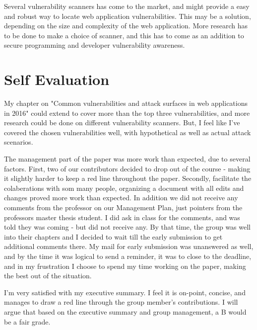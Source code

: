 Several vulnerability scanners has come to the market, and might provide a easy and robust way to locate web application vulnerabilities. This may be a solution, depending on the size and complexity of the web application. More research has to be done to make a choice of scanner, and this has to come as an addition to secure programming and developer vulnerability awareness.

\section*{Self Evaluation}
My chapter on "Common vulnerabilities and attack surfaces in web applications in 2016" could extend to cover more than the top three vulnerabilities, and more research could be done on different vulnerability scanners. But, I feel like I've covered the chosen vulnerabilities well, with hypothetical as well as actual attack scenarios.

The management part of the paper was more work than expected, due to several factors. First, two of our contributors decided to drop out of the course - making it slightly harder to keep a red line throughout the paper. Secondly, facilitate the colaberations with som many people, organizing a document with all edits and changes proved more work than expected. In addition we did not receive any comments from the professor on our Management Plan, just pointers from the professors master thesis student. I did ask in class for the comments, and was told they was coming - but did not receive any. By that time, the group was well into their chapters and I decided to wait till the early submission to get additional comments there. My mail for early submission was unanswered as well, and by the time it was logical to send a reminder, it was to close to the deadline, and in my frustration I choose to spend my time working on the paper, making the best out of the situation.

I'm very satisfied with my executive summary. I feel it is on-point, concise, and manages to draw a red line through the group member's contributions.
I will argue that based on the executive summary and group management, a B  would be a fair grade. 
 
